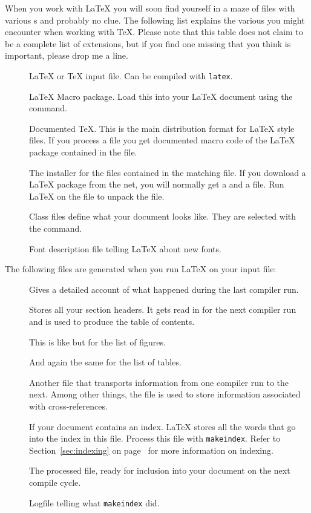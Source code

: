 When you work with \LaTeX{} you will soon find yourself in a maze of
files with various s and probably no clue. The following
list explains the various  you might encounter when
working with \TeX{}. Please note that this table does not claim to be
a complete list of extensions, but if you find one missing that you
think is important, please drop me a line.

\begin{description}

  \item[] \LaTeX{} or \TeX{} input file. Can be compiled with
    \texttt{latex}.
  \item[] \LaTeX{} Macro package. Load this
    into your \LaTeX{} document using the  command.
  \item[] Documented \TeX{}. This is the main distribution
    format for \LaTeX{} style files. If you process a  file you get
    documented macro code of the \LaTeX{} package contained in the 
    file.
  \item[] The installer for the files contained in the
    matching  file. If you download a \LaTeX{} package from the net,
    you will normally get a  and a  file. Run \LaTeX{} on the
     file to unpack the  file.
  \item[] Class files define what your document looks
    like. They are selected with the  command.
  \item[] Font description file telling  \LaTeX{} about new fonts.
\end{description}

The following files are generated when you run \LaTeX{} on your input
file:
\begin{description}
  \item[] Gives a detailed account of what happened during the
    last compiler run.
  \item[] Stores all your section headers. It gets read in for the
    next compiler run and is used to produce the table of contents.
  \item[] This is like  but for the list of figures.
  \item[] And again the same for the list of tables.
  \item[] Another file that transports information from one
    compiler run to the next. Among other things, the  file is used
    to store information associated with cross-references.
  \item[] If your document contains an index. \LaTeX{} stores all
    the words that go into the index in this file. Process this file with
    \texttt{makeindex}. Refer to Section~\ref{sec:indexing} on
    page~\pageref{sec:indexing} for more information on indexing.
  \item[] The processed  file, ready for inclusion into your
    document on the next compile cycle.
  \item[] Logfile telling what \texttt{makeindex} did.
\end{description}
